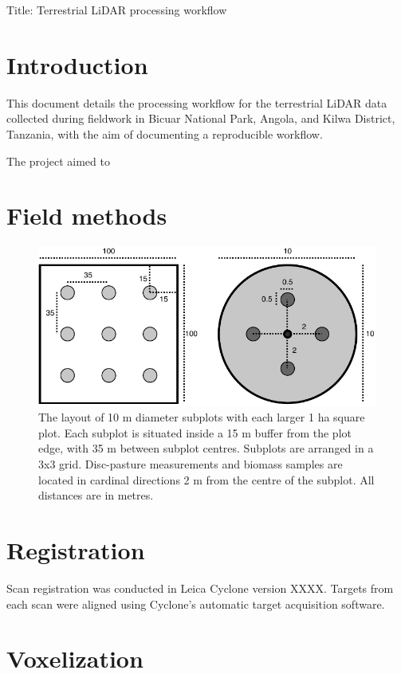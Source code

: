 \documentclass[11pt,a4paper]{article}
\newcommand{\titletext}{Terrestrial LiDAR processing workflow}
\begin{document}
{\Large{Title: \titletext{}}}

\section{Introduction}

This document details the processing workflow for the terrestrial LiDAR data collected during fieldwork in Bicuar National Park, Angola, and Kilwa District, Tanzania, with the aim of documenting a reproducible workflow.

The project aimed to 

\section{Field methods}

\begin{figure}[H]
\centering
	\includegraphics[width=\textwidth]{subplot}
	\caption{The layout of 10 m diameter subplots with each larger 1 ha square plot. Each subplot is situated inside a 15 m buffer from the plot edge, with 35 m between subplot centres. Subplots are arranged in a 3x3 grid. Disc-pasture measurements and biomass samples are located in cardinal directions 2 m from the centre of the subplot. All distances are in metres.}
	\label{subplot}
\end{figure}

\section{Registration}

Scan registration was conducted in Leica Cyclone version XXXX. Targets from each scan were aligned using Cyclone's automatic target acquisition software. 

\section{Voxelization}
\end{document}
